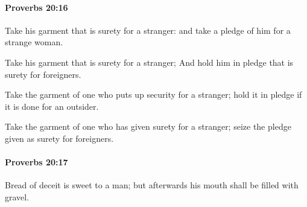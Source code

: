 		\paragraph{Proverbs 20:16} %
			\label{PROVERBS-20-16}

			Take his garment that is surety for a stranger: and take a pledge of him for a strange woman.

			\begin{versebox}
					\item[BHS] 
					\item[ASV] Take his garment that is surety for a stranger; And hold him in pledge that is surety for foreigners.
					\item[NIV] Take the garment of one who puts up security for a stranger; hold it in pledge if it is done for an outsider.
					\item[NRSV] Take the garment of one who has given surety for a stranger; seize the pledge given as surety for foreigners.
			\end{versebox}

		\paragraph{Proverbs 20:17} %
			\label{PROVERBS-20-17}

			Bread of deceit is sweet to a man; but afterwards his mouth shall be filled with gravel.


